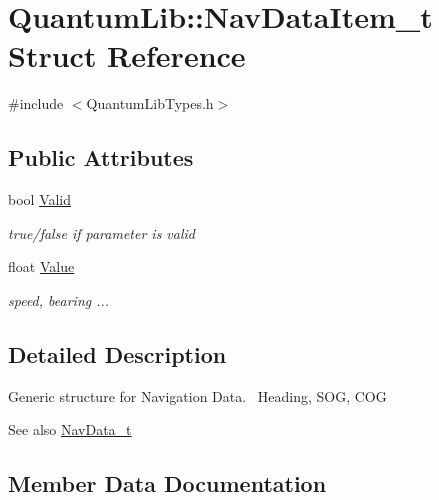 \hypertarget{struct_quantum_lib_1_1_nav_data_item__t}{}\section{Quantum\+Lib\+:\+:Nav\+Data\+Item\+\_\+t Struct Reference}
\label{struct_quantum_lib_1_1_nav_data_item__t}


{\ttfamily \#include $<$Quantum\+Lib\+Types.\+h$>$}

\subsection*{Public Attributes}
\begin{DoxyCompactItemize}
\item 
bool \mbox{\hyperlink{struct_quantum_lib_1_1_nav_data_item__t_a3afc8318642d9cd71140a615902b17ba}{Valid}}
\begin{DoxyCompactList}\small\item\em true/false if parameter is valid \end{DoxyCompactList}\item 
float \mbox{\hyperlink{struct_quantum_lib_1_1_nav_data_item__t_adc4958b22d1565c0697cf62208f5d3ca}{Value}}
\begin{DoxyCompactList}\small\item\em speed, bearing ... \end{DoxyCompactList}\end{DoxyCompactItemize}


\subsection{Detailed Description}
Generic structure for Navigation Data.~\newline
Heading, S\+OG, C\+OG \begin{DoxySeeAlso}{See also}
\mbox{\hyperlink{struct_quantum_lib_1_1_nav_data__t}{Nav\+Data\+\_\+t}} 
\end{DoxySeeAlso}


\subsection{Member Data Documentation}
\mbox{\label{struct_quantum_lib_1_1_nav_data_item__t_a3afc8318642d9cd71140a615902b17ba}} 
